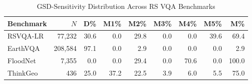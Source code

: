 \begin{table}[t]
\centering
\caption{GSD-Sensitivity Distribution Across RS VQA Benchmarks}
\label{tab:cross_benchmark}
\begin{tabular}{lrrrrrrrr}
\hline
Benchmark & $N$ & D\% & M1\% & M2\% & M3\% & M4\% & M5\% & M\% \\
\hline
RSVQA-LR & 77,232 & 30.6 & 0.0 & 29.8 & 0.0 & 0.0 & 39.6 & 69.4 \\
EarthVQA & 208,584 & 97.1 & 0.0 & 2.9 & 0.0 & 0.0 & 0.0 & 2.9 \\
FloodNet & 7,355 & 0.0 & 0.0 & 29.4 & 0.0 & 70.6 & 0.0 & 100.0 \\
ThinkGeo & 436 & 25.0 & 37.2 & 22.5 & 3.9 & 6.0 & 5.5 & 75.0 \\
\hline
\end{tabular}
\end{table}